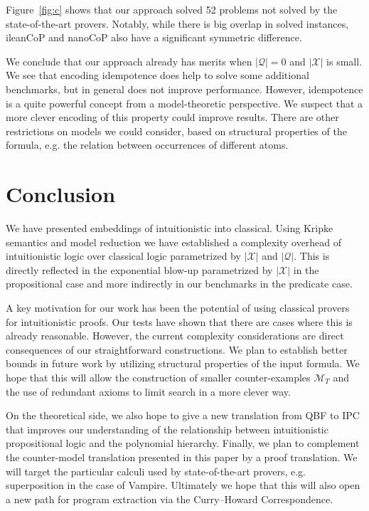 \documentclass{easychair}
\theoremstyle{definition}
\theoremstyle{definition}
\theoremstyle{definition}
\theoremstyle{definition}
\theoremstyle{definition}
\theoremstyle{definition}
\theoremstyle{definition}
\begin{document}
Figure~\ref{fig:c} shows that our approach solved 52 problems not solved by the state-of-the-art provers. Notably, while there is big overlap in solved instances, ileanCoP and nanoCoP also have a significant symmetric difference.

We conclude that our approach already has merits when $|\mathcal Q| = 0$ and $|\mathcal X|$ is small.
We see that encoding idempotence does help to solve some additional benchmarks, but in general does not improve performance.
However, idempotence is a quite powerful concept from a model-theoretic perspective. We suspect that a more clever encoding of this property could improve results. There are other restrictions on models we could consider, based on structural properties of the formula, e.g. the relation between occurrences of different atoms.

\section{Conclusion}

We have presented embeddings of intuitionistic into classical. Using Kripke semantics and model reduction we have established a complexity overhead of intuitionistic logic over classical logic parametrized by $|\mathcal X|$ and $|\mathcal Q|$. This is directly reflected in the exponential blow-up parametrized by $|\mathcal X|$ in the propositional case and more indirectly in our benchmarks in the predicate case.

A key motivation for our work has been the potential of using classical provers for intuitionistic proofs. Our tests have shown that there are cases where this is already reasonable.
However, the current complexity considerations are direct consequences of our straightforward constructions. We plan to establish better bounds in future work by utilizing structural properties of the input formula. We hope that this will allow the construction of smaller counter-examples $\mathcal M_T$ and the use of redundant axioms to limit search in a more clever way.

On the theoretical side, we also hope to give a new translation from QBF to IPC that improves our understanding of the relationship between intuitionistic propositional logic and the polynomial hierarchy.
Finally, we plan to complement the counter-model translation presented in this paper by a proof translation.
We will target the particular calculi used by state-of-the-art provers, e.g. superposition in the case of Vampire. Ultimately we hope that this will also open a new path for program extraction via the Curry--Howard Correspondence.
\end{document}
